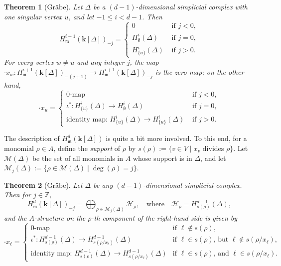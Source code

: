 \documentclass[10pt]{amsart}
\newtheorem{theorem}{Theorem}[section]
\theoremstyle{definition}
\newcommand{\field}{\mathbf{k}}
\newcommand{\ZZ}{{\mathbb Z}}
\newcommand{\M}{{\mathcal M}}
\newcommand{\HH}{{\mathcal H}}
\newcommand{\mideal}{\ensuremath{\mathfrak{m}}}
\begin{document}
\begin{theorem}[Gr{\"a}be] \label{local-cohom-1-singul}
Let $\Delta$ be a $(d-1)$-dimensional simplicial complex with one singular vertex $u$, and let $-1\leq i <d-1$. Then
\[
H^{i+1}_\mideal(\field[\Delta])_{-j}=\begin{cases}
0 & \mbox{ if $j<0$},\\
H^i_\emptyset(\Delta) & \mbox{ if $j=0$},\\
H^i_{\{u\}}(\Delta) & \mbox{ if $j>0$}.
\end{cases}
\]
For every vertex $w\neq u$ and any integer $j$, the map $\cdot x_w: H^{i+1}_\mideal(\field[\Delta])_{-(j+1)} \to H^{i+1}_\mideal(\field[\Delta])_{-j}$ is the zero map; on the other hand, 
\[\cdot x_u= \begin{cases}
\mbox{$0$-map} & \mbox{ if $j<0$},\\
\iota^*: H^i_{\{u\}}(\Delta) \to H^i_\emptyset(\Delta) & \mbox{ if $j=0$},\\
\mbox{identity map: $H^i_{\{u\}}(\Delta) \to H^i_{\{u\}}(\Delta)$} & \mbox{ if $j>0$}.
\end{cases}
\]
\end{theorem}

The description of $H^d_\mideal(\field[\Delta])$ is quite a bit more involved. To this end, for a monomial $\rho\in A$, define the \emph{support} of $\rho$ by $s(\rho):=\{v\in V \mid x_v \mbox{ divides }\rho\}$. Let $\M(\Delta)$ be the set of all monomials in $A$ whose support is in $\Delta$, and let $\M_j(\Delta):=\{\rho\in\M(\Delta) \mid \deg(\rho)=j\}$.

\begin{theorem}[Gr{\"a}be] \label{Grabe-d}
Let $\Delta$ be any $(d-1)$-dimensional simplicial complex. Then for $j\in\ZZ$, 
\[ H^d_{\mideal}(\field[\Delta])_{-j}=\bigoplus_{\rho\in\M_j(\Delta)} \HH_{\rho}, \quad \mbox{where} \quad \HH_{\rho}=H^{d-1}_{s(\rho)}(\Delta),\]
and the $A$-structure on the $\rho$-th component of the right-hand side is given by
\[
\cdot x_\ell = \begin{cases} 
\mbox{$0$-map} & \mbox{if $\ell\notin s(\rho)$},\\
\iota^*: H^{d-1}_{s(\rho)}(\Delta) \to H^{d-1}_{s(\rho/x_\ell)}(\Delta) & \mbox{if $\ell\in s(\rho)$, but $\ell\notin s(\rho/x_\ell)$},\\
\mbox{identity map: $H^{d-1}_{s(\rho)}(\Delta) \to H^{d-1}_{s(\rho/x_\ell)}(\Delta)$} & \mbox{if $\ell\in s(\rho)$, and $\ell\in s(\rho/x_\ell)$}.
\end{cases}
\]
\end{theorem}
\end{document}
